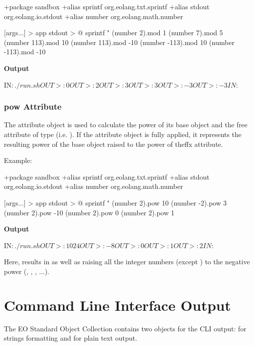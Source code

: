 \documentclass[12pt]{book}
\begin{document}
{{{\begin{ffcode}
+package sandbox
+alias sprintf org.eolang.txt.sprintf
+alias stdout org.eolang.io.stdout
+alias number org.eolang.math.number

[args...] > app
  stdout > @
    sprintf
      "%
      (number 2).mod 1
      (number 7).mod 5
      (number 113).mod 10
      (number 113).mod -10
      (number -113).mod 10
      (number -113).mod -10

\end{ffcode}
\textbf{Output}
\begin{ffcode}

IN$: ./run.sh
OUT>: 0
OUT>: 2
OUT>: 3
OUT>: 3
OUT>: -3
OUT>: -3
IN$:
\end{ffcode}

\subsubsection{pow Attribute}
The  attribute object is used to calculate the power of its base  object and the free attribute  of type  (i.e. ).
If the  attribute object is fully applied, it represents the resulting power of the base  object raised to the power of theff{x} attribute.

Example:
\begin{ffcode}
+package sandbox
+alias sprintf org.eolang.txt.sprintf
+alias stdout org.eolang.io.stdout
+alias number org.eolang.math.number

[args...] > app
  stdout > @
    sprintf
      "%
      (number 2).pow 10
      (number -2).pow 3
      (number 2).pow -10
      (number 2).pow 0
      (number 2).pow 1
\end{ffcode}
\textbf{Output}
\begin{ffcode}
IN$: ./run.sh
OUT>: 1024
OUT>: -8
OUT>: 0
OUT>: 1
OUT>: 2
IN$:
\end{ffcode}
Here,  results in  as well as raising all the integer numbers (except ) to the negative power (, , , ...).

\section{Command Line Interface Output}
The EO Standard Object Collection contains two objects for the CLI output:  for strings formatting and  for plain text output.

}}}
\end{document}
